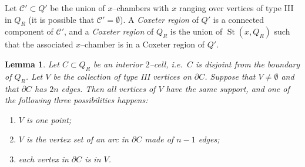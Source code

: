 \documentclass[11pt]{amsart}
\newcommand{\St}{\operatorname{St}}
\newcommand {\C}{\mathcal C}
\newtheorem{lemma}[theorem]{Lemma}
\theoremstyle{definition}
\begin{document}
Let $\C'\subset Q'$ be the union of $x$--chambers with $x$ ranging over vertices of type III in $Q_R$ (it is possible that $\C'=\emptyset$). A \emph{Coxeter region} of $Q'$ is a connected component of $\C'$, and a \emph{Coxeter region} of $Q_R$ is the union of $\St(x,Q_R)$ such that the associated $x$--chamber is in a Coxeter region of $Q'$.
 
\begin{lemma}
	\label{lem:local convexity}
Let $C\subset Q_R$ be an interior $2$--cell, i.e.\ $C$ is disjoint from the boundary of $Q_R$. Let $V$ be the collection of type III vertices on $\partial C$. Suppose that $V\neq\emptyset$ and that $\partial C$ has $2n$ edges. Then all vertices of $V$ have the same support, and one of the following three possibilities happens:
\begin{enumerate}
	\item $V$ is one point;
	\item $V$ is the vertex set of an arc in $\partial C$ made of $n-1$ edges;
	\item each vertex in $\partial C$ is in $V$.
\end{enumerate}
\end{lemma}
\end{document}
